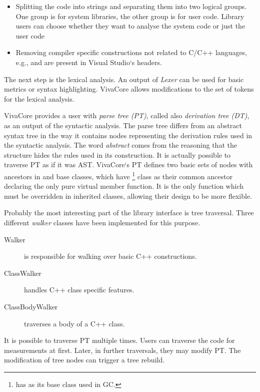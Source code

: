 \begin{itemize}
\item Splitting the code into strings and separating them into two logical groups. One group is for system libraries, the other group is for user code. Library users can choose whether they want to analyse the system code or just the user code
\item Removing compiler specific constructions not related to C/C++ languages, e.g.,  and  are present in Visual Studio`s headers.
\end{itemize}

The next step is the lexical analysis. An output of \emph{Lexer} can be used for basic metrics or syntax highlighting. VivaCore allows modifications to the set of tokens for the lexical analysis.

VivaCore provides a user with \emph{parse tree (PT)}, called also \emph{derivation tree (DT)}, as an output of the syntactic analysis. The parse tree differs from an abstract syntax tree in the way it contains nodes representing the derivation rules used in the syntactic analysis. The word \emph{abstract} comes from the reasoning that the structure hides the rules used in its construction. It is actually possible to traverse PT as if it was AST. VivaCore`s PT defines two basic sets of nodes with ancestors in  and  base classes, which have \footnote{ has  as its base class used in GC.} class as their common ancestor declaring the only pure virtual member function. It is the only function which must be overridden in inherited classes, allowing their design to be more flexible.

Probably the most interesting part of the library interface is tree traversal. Three different \emph{walker} classes have been implemented for this purpose.

\begin{description}
\item[Walker] is responsible for walking over basic C++ constructions.
\item[ClassWalker] handles C++ class specific features.
\item[ClassBodyWalker] traverses a body of a C++ class.
\end{description}

It is possible to traverse PT multiple times. Users can traverse the code for measurements at first. Later, in further traversals, they may modify PT. The modification of tree nodes can trigger a tree rebuild.

